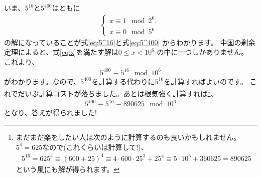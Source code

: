 \documentclass{jsarticle}
\begin{document}
いま、$5^{16}$と$5^{400}$はともに
\begin{align}
\left\{
\begin{array}{l}
x\equiv 1 \mod 2^{6},\\
x\equiv 0 \mod 5^{6}
\end{array}
\right.
\label{eq:x}
\end{align}
の解になっていることが式\eqref{eq:5^16}と式\eqref{eq:5^400}
からわかります。
中国の剰余定理によると、式\eqref{eq:x}を満たす解は$0\leq x<10^{6}$
の中に一つしかありません。
これより、
\begin{align}
5^{400}\equiv 5^{16}\mod 10^{6}
\end{align}
がわかります。なので、$5^{400}$を計算する代わりに$5^{16}$を計算すればよいのです。
これでだいぶ計算コストが落ちました。あとは根気強く計算すれば\footnote{
まだまだ楽をしたい人は次のように計算するのも良いかもしれません。
$5^{4}=625$なので(これくらいは計算して!)、
\begin{align*}
5^{16}=625^{4}\equiv(600+25)^4
\equiv 4\cdot 600\cdot25^{3}+25^{4}
\equiv 5\cdot 10^{5}+360625=890625
\end{align*}
という風にも解が得られます。
}、
\begin{align}
5^{400}\equiv 5^{16}\equiv 890625 \mod 10^{6}
\end{align}
となり、答えが得られました!
\end{document}

